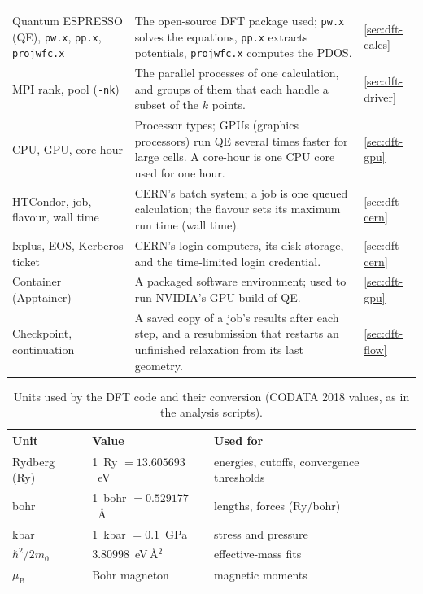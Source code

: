 \begin{small}
\begin{longtable}{@{}>{\raggedright\arraybackslash}p{3.3cm}>{\raggedright\arraybackslash}p{9.0cm}>{\raggedright\arraybackslash}p{1.6cm}@{}}
\midrule
\multicolumn{3}{@{}l}{\textit{Computing}}\\
Quantum ESPRESSO (QE), \texttt{pw.x}, \texttt{pp.x}, \texttt{projwfc.x} & The open-source DFT package used; \texttt{pw.x}
solves the equations, \texttt{pp.x} extracts potentials, \texttt{projwfc.x} computes the PDOS. & \ref{sec:dft-calcs} \\
MPI rank, pool (\texttt{-nk}) & The parallel processes of one calculation, and groups of them that each handle a subset
of the $k$ points. & \ref{sec:dft-driver} \\
CPU, GPU, core-hour & Processor types; GPUs (graphics processors) run QE several times faster for large cells. A
core-hour is one CPU core used for one hour. & \ref{sec:dft-gpu} \\
HTCondor, job, flavour, wall time & CERN's batch system; a job is one queued calculation; the flavour sets its maximum
run time (wall time). & \ref{sec:dft-cern} \\
lxplus, EOS, Kerberos ticket & CERN's login computers, its disk storage, and the time-limited login credential. & \ref{sec:dft-cern} \\
Container (Apptainer) & A packaged software environment; used to run NVIDIA's GPU build of QE. & \ref{sec:dft-gpu} \\
Checkpoint, continuation & A saved copy of a job's results after each step, and a resubmission that restarts an
unfinished relaxation from its last geometry. & \ref{sec:dft-flow} \\
\end{longtable}
\end{small}

\begin{table}[htbp]\centering\small
\caption{Units used by the DFT code and their conversion (CODATA 2018 values, as in the analysis scripts).}
\label{tab:dft-units}
\begin{tabular}{@{}lll@{}}
\toprule
Unit & Value & Used for \\
\midrule
Rydberg (Ry) & 1~Ry $= 13.605693$~eV & energies, cutoffs, convergence thresholds \\
bohr & 1~bohr $= 0.529177$~\AA & lengths, forces (Ry/bohr) \\
kbar & 1~kbar $= 0.1$~GPa & stress and pressure \\
$\hbar^2/2m_0$ & $3.80998$~eV\,\AA$^2$ & effective-mass fits \\
$\mu_{\mathrm{B}}$ & Bohr magneton & magnetic moments \\
\bottomrule
\end{tabular}
\end{table}

